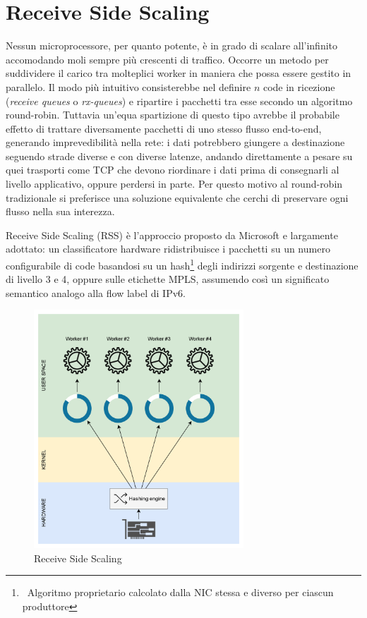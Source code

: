\section{Receive Side Scaling}

Nessun microprocessore, per quanto potente, è in grado di scalare all'infinito accomodando moli sempre più crescenti di traffico. Occorre un metodo per suddividere il carico tra molteplici worker in maniera che possa essere gestito in parallelo. Il modo più intuitivo consisterebbe nel definire $n$ code in ricezione (\textit{receive queues} o \mbox{\textit{rx-queues}}) e ripartire i pacchetti tra esse secondo un algoritmo round-robin. Tuttavia un'equa spartizione di questo tipo avrebbe il probabile effetto di trattare diversamente pacchetti di uno stesso flusso end-to-end, generando imprevedibilità nella rete: i dati potrebbero giungere a destinazione seguendo strade diverse e con diverse latenze, andando direttamente a pesare su quei trasporti come TCP che devono riordinare i dati prima di consegnarli al livello applicativo, oppure perdersi in parte. Per questo motivo al round-robin tradizionale si preferisce una soluzione equivalente che cerchi di preservare ogni flusso nella sua interezza.

Receive Side Scaling (RSS) è l'approccio proposto da Microsoft e largamente adottato: un classificatore hardware ridistribuisce i pacchetti su un numero configurabile di code basandosi su un hash\footnote{\ Algoritmo proprietario calcolato dalla NIC stessa e diverso per ciascun produttore} degli indirizzi sorgente e destinazione di livello 3 e 4, oppure sulle etichette MPLS, assumendo così un significato semantico analogo alla flow label di IPv6.

\begin{figure}[htb]
    \includegraphics[width=0.7\textwidth]{graphics/rss.png}
    \caption{Receive Side Scaling\protect\footnotemark}
    \label{fig:rss}
\end{figure}


